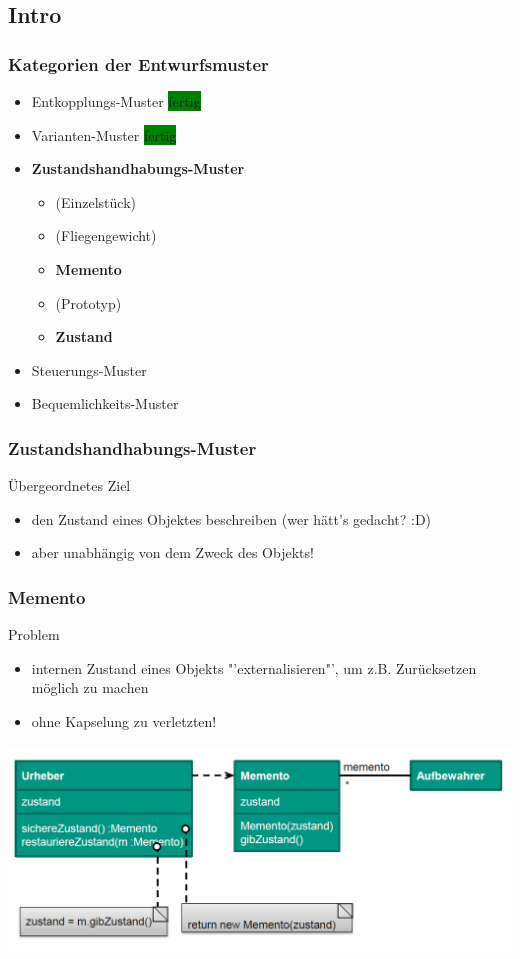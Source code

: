 \documentclass[18pt]{beamer}
\begin{document}
	\subsection{Intro}
	\begin{frame}
		\frametitle{Kategorien der Entwurfsmuster}
		\begin{itemize}
			\item Entkopplungs-Muster \colorbox{green}{fertig}
			\item Varianten-Muster \colorbox{green}{fertig}
			\item \textbf{Zustandshandhabungs-Muster}
				\begin{itemize}
					\item (Einzelstück)
					\item (Fliegengewicht)
					\item \textbf{Memento} 
					\item (Prototyp) 
					\item \textbf{Zustand}
				\end{itemize}
			\item Steuerungs-Muster
			\item Bequemlichkeits-Muster
		\end{itemize}
	\end{frame}

	\begin{frame}
		\frametitle{Zustandshandhabungs-Muster}
		\begin{block}{Übergeordnetes Ziel}
			\begin{itemize}
				\item den Zustand eines Objektes beschreiben (wer hätt's gedacht? :D) \pause 
				\item aber unabhängig von dem Zweck des Objekts!
			\end{itemize}
		\end{block}
	\end{frame}


	\begin{frame}
		\frametitle{Memento}
		\begin{block}{Problem}
			\begin{itemize}
				\item internen Zustand eines Objekts "'externalisieren"', um z.B. Zurücksetzen möglich zu machen \pause 
				\item ohne Kapselung zu verletzten!
			\end{itemize}
		\end{block}
		\pause
		\centering
		\includegraphics[scale=0.4]{./pics/tut4/mem.png}
	\end{frame}
\end{document}
